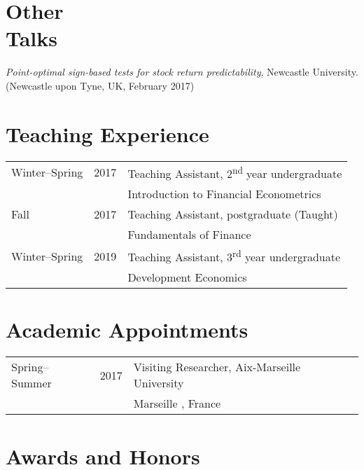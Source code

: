 \documentclass[margin,line,pifont,palatino,courier]{res}
\newcommand{\ts}{\textsuperscript}
\begin{document}
\begin{resume}
\hrulefill

\section{\sc \textbf{Other\\ Talks}}

\emph{Point-optimal sign-based tests for stock return predictability}, Newcastle University. (Newcastle upon Tyne, UK, February 2017)

\hrulefill

\section{\sc \textbf{Teaching Experience}}

\begin{tabular}{@{}p{1.3in}p{0.8in}p{4in}}
Winter--Spring & 2017 & Teaching Assistant, 2\ts{nd} year undergraduate \\
&&Introduction to Financial Econometrics\\
\rule{0pt}{4ex}Fall & 2017 & Teaching Assistant, postgraduate (Taught)\\
&& Fundamentals of Finance\\
\rule{0pt}{4ex}Winter--Spring & 2019 &Teaching Assistant, 3\ts{rd} year undergraduate\\
&&Development Economics
\end{tabular}

\hrulefill

\section{\sc \bf Academic Appointments}

\begin{tabular}{@{}p{1.3in}p{0.7in}p{4in}}
Spring--Summer & 2017 &Visiting Researcher, Aix-Marseille University\\
&&Marseille , France
\end{tabular}

\hrulefill

\section{\sc \bf Awards and Honors}


\end{resume}
\end{document}
